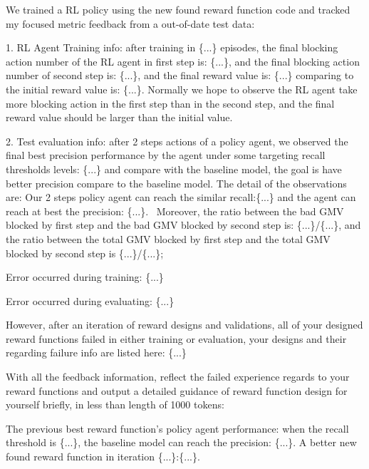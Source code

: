 \documentclass[11pt]{article}
\begin{document}
\begin{tcolorbox}[title=Prompt 4: Feedback Prompts, colframe=blue, colback=white, breakable]

We trained a RL policy using the new found reward function code and tracked my focused metric feedback from a out-of-date test data: 

1. RL Agent Training info: after training in \{...\} episodes, the final blocking action number of the RL agent in first step is: \{...\}, and the final blocking action number of second step is: \{...\}, and the final reward value is: \{...\} comparing to the initial reward value is: \{...\}. Normally we hope to observe the RL agent take more blocking action in the first step than in the second step, and the final reward value should be larger than the initial value.

2. Test evaluation info: after 2 steps actions of a policy agent, we observed the final best precision performance by the agent under some targeting recall thresholds levels: \{...\} and compare with the baseline model, the goal is have better precision compare to the baseline model. The detail of the observations are: Our 2 steps policy agent can reach the similar recall:\{...\} and the agent can reach at best the precision: \{...\}. \
Moreover, the ratio between the bad GMV blocked by first step and the bad GMV blocked by second step is: \{...\}/\{...\}, and the ratio between the total GMV blocked by first step and the total GMV blocked by second step is \{...\}/\{...\};

Error occurred during training: \{...\}

Error occurred during evaluating: \{...\}
\end{tcolorbox}

\begin{tcolorbox}[title=Prompt 5: Reflection Prompts if No Usable Reward Function Found, colframe=blue, colback=white, breakable]

However, after an iteration of reward designs and validations, all of your designed reward functions failed in either training or evaluation, your designs and their regarding failure info are listed here: \{...\}

With all the feedback information, reflect the failed experience regards to your reward functions and output a detailed guidance of reward function design for yourself briefly, in less than length of 1000 tokens:
\end{tcolorbox}

\begin{tcolorbox}[title=Prompt 6: Reflection Prompts if A Better Reward Function Found, colframe=blue, colback=white, breakable]

The previous best reward function's policy agent performance: when the recall threshold is \{...\}, the baseline model can reach the precision: \{...\}. A better new found reward function in iteration \{...\}:\{...\}.
\end{tcolorbox}
\end{document}

